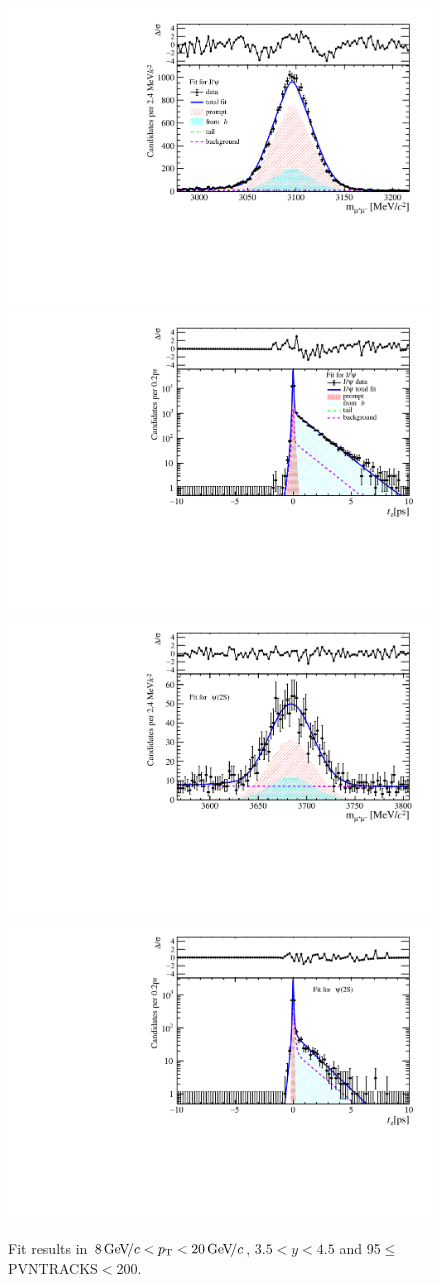 \begin{figure}[H]
\begin{center}
\includegraphics[width=0.47\linewidth]{pdf/Jpsi/drawmass/n5y3pt5.pdf}
\includegraphics[width=0.47\linewidth]{pdf/Jpsi/2DFit/n5y3pt5.pdf}
\vspace*{-0.5cm}
\includegraphics[width=0.47\linewidth]{pdf/Psi2S/drawmass/n5y3pt5.pdf}
\includegraphics[width=0.47\linewidth]{pdf/Psi2S/2DFit/n5y3pt5.pdf}
\vspace*{-0.5cm}
\end{center}
\caption{Fit results in $8\text{\,Ge\kern -0.1em V\!/}c<p_{\mathrm{T}}<20\text{\,Ge\kern -0.1em V\!/}c$, $3.5<y<4.5$ and 95$\leq$PVNTRACKS$<$200.}
\label{Fitn5y3pt5}
\end{figure}
